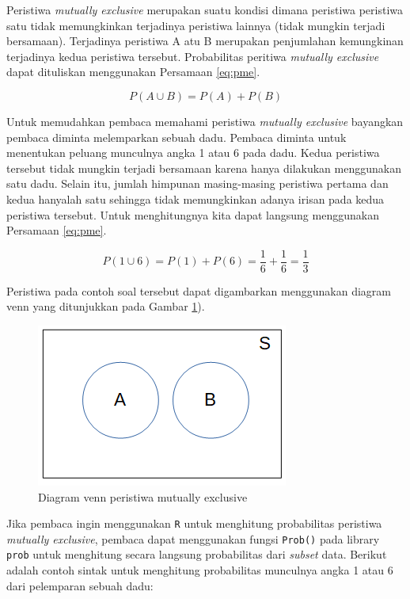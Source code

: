 \documentclass[]{book}
\begin{document}
Peristiwa \emph{mutually exclusive} merupakan suatu kondisi dimana
peristiwa peristiwa satu tidak memungkinkan terjadinya peristiwa lainnya
(tidak mungkin terjadi bersamaan). Terjadinya peristiwa A atu B
merupakan penjumlahan kemungkinan terjadinya kedua peristiwa tersebut.
Probabilitas peritiwa \emph{mutually exclusive} dapat dituliskan
menggunakan Persamaan \eqref{eq:pme}.

\begin{equation}
   P\left(A\cup B\right)=P\left(A\right)+P\left(B\right)
  \label{eq:pme}
\end{equation}

Untuk memudahkan pembaca memahami peristiwa \emph{mutually exclusive}
bayangkan pembaca diminta melemparkan sebuah dadu. Pembaca diminta untuk
menentukan peluang munculnya angka 1 atau 6 pada dadu. Kedua peristiwa
tersebut tidak mungkin terjadi bersamaan karena hanya dilakukan
menggunakan satu dadu. Selain itu, jumlah himpunan masing-masing
peristiwa pertama dan kedua hanyalah satu sehingga tidak memungkinkan
adanya irisan pada kedua peristiwa tersebut. Untuk menghitungnya kita
dapat langsung menggunakan Persamaan \eqref{eq:pme}.

\[
P\left(1\cup 6\right)=P\left(1\right)+P\left(6\right)=\frac{1}{6}+\frac{1}{6}=\frac{1}{3}
\]

Peristiwa pada contoh soal tersebut dapat digambarkan menggunakan
diagram venn yang ditunjukkan pada Gambar \ref{fig:pmevis}).

\begin{figure}

{\centering \includegraphics[width=0.8\linewidth]{pmevis} 

}

\caption{Diagram venn peristiwa mutually exclusive}\label{fig:pmevis}
\end{figure}

Jika pembaca ingin menggunakan \texttt{R} untuk menghitung probabilitas
peristiwa \emph{mutually exclusive}, pembaca dapat menggunakan fungsi
\texttt{Prob()} pada library \texttt{prob} untuk menghitung secara
langsung probabilitas dari \emph{subset} data. Berikut adalah contoh
sintak untuk menghitung probabilitas munculnya angka 1 atau 6 dari
pelemparan sebuah dadu:
\end{document}
